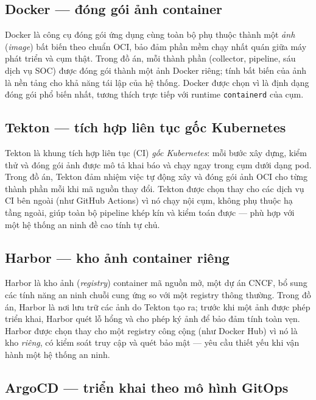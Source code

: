 \subsection{Docker --- đóng gói ảnh container}

Docker là công cụ đóng gói ứng dụng cùng toàn bộ phụ thuộc thành một \emph{ảnh}
(\textit{image}) bất biến theo chuẩn OCI, bảo đảm phần mềm chạy nhất quán giữa máy phát
triển và cụm thật. Trong đồ án, mỗi thành phần (collector, pipeline, sáu dịch vụ SOC) được
đóng gói thành một ảnh Docker riêng; tính bất biến của ảnh là nền tảng cho khả năng tái lập
của hệ thống. Docker được chọn vì là định dạng đóng gói phổ biến nhất, tương thích trực
tiếp với runtime \texttt{containerd} của cụm.

\subsection{Tekton --- tích hợp liên tục gốc Kubernetes}

Tekton là khung tích hợp liên tục (CI) \emph{gốc Kubernetes}: mỗi bước xây dựng, kiểm thử
và đóng gói ảnh được mô tả khai báo và chạy ngay trong cụm dưới dạng pod. Trong đồ án,
Tekton đảm nhiệm việc tự động xây và đóng gói ảnh OCI cho từng thành phần mỗi khi mã nguồn
thay đổi. Tekton được chọn thay cho các dịch vụ CI bên ngoài (như GitHub Actions) vì nó
chạy nội cụm, không phụ thuộc hạ tầng ngoài, giúp toàn bộ pipeline khép kín và kiểm toán
được --- phù hợp với một hệ thống an ninh đề cao tính tự chủ.

\subsection{Harbor --- kho ảnh container riêng}

Harbor là kho ảnh (\textit{registry}) container mã nguồn mở, một dự án CNCF, bổ sung các
tính năng an ninh chuỗi cung ứng so với một registry thông thường. Trong đồ án, Harbor là
nơi lưu trữ các ảnh do Tekton tạo ra; trước khi một ảnh được phép triển khai, Harbor quét
lỗ hổng và cho phép ký ảnh để bảo đảm tính toàn vẹn. Harbor được chọn thay cho một registry
công cộng (như Docker Hub) vì nó là kho \emph{riêng}, có kiểm soát truy cập và quét bảo mật
--- yêu cầu thiết yếu khi vận hành một hệ thống an ninh.

\subsection{ArgoCD --- triển khai theo mô hình GitOps}

